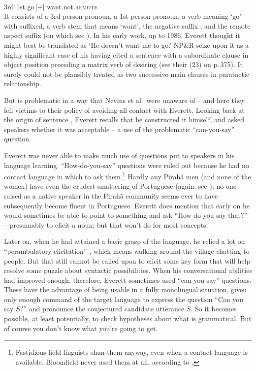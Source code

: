 \documentclass[output=paper,colorlinks,citecolor=brown
]{langscibook}
\begin{document}
\ea\label{ex:pullum:3}
\gll {}    
            \\
         3rd 1st go\,[+] want.not.\textsc{remote}\\
\z
\noindent
It consists of a 3rd-person pronoun, a 1st-person pronoun, a
verb meaning `go' with \mbox{} suffixed, a verb stem that
means `want', the negative suffix , and the remote aspect
suffix  (on which see \citealt[293--294]{Everett86HAL}). In
his early work, up to 1986, Everett thought it might best be translated
as `He doesn't want me to go.' NP\&R seize upon it as a highly significant
case of his having cited a sentence with a subordinate clause in
object position preceding a matrix verb of desiring (see their (23)
on p.\,375). It surely could not be plausibly treated as two successive
main clauses in paratactic relationship.

But  is problematic in a way that Nevins et al.\ were
unaware of -- and here they fell victims to their policy of avoiding
all contact with Everett. Looking back at the origin of sentence
, Everett recalls that he constructed it himself,
and asked speakers whether it was acceptable -- a use of the
problematic ``can-you-say'' question.

Everett was never able to make much use of questions put to speakers
in his language learning.  ``How-do-you-say'' questions
\parencites[114, Ch.~6]{Samarin67}[{\textsection}6.4]{SakeEver12} were ruled out because he had no contact language in
which to ask them.\footnote{\label{voegelin}
   Fastidious field linguists shun them anyway, even when a contact language
   is available. Bloomfield never used them at all, according to
   \citet[204]{Voegelin60}.}
Hardly any Pirah{\~a} men (and none of the women) have even the crudest
smattering of Portuguese (again, see \citealt{Sakel12}); no one raised
as a native speaker in the Pirah{\~a} community seems ever to have
subsequently become fluent in Portuguese. Everett does mention that
early on he would sometimes be able to point to something and ask
``How do you say that?'' \citep[20]{Everett08} -- presumably
to elicit a noun; but that won't do for most concepts.

Later on, when he had attained a basic grasp of the language, he relied
a lot on ``perambulatory elicitation'' \citep[200]{Everett86HAL}, which
means walking around the village chatting to people. But that still
cannot be called upon to elicit some key form that will help resolve
some puzzle about syntactic possibilities. When his conversational
abilities had improved enough, therefore, Everett sometimes used
``can-you-say'' questions. These have the advantage of being usable in
a fully monolingual situation, given only enough command of the target
language to express the question ``Can you say $S$?'' and pronounce the
conjectured candidate utterance $S$. So it becomes possible, at least
potentially, to check hypotheses about what is grammatical. But of
course you don't know what you're going to get.
\end{document}
